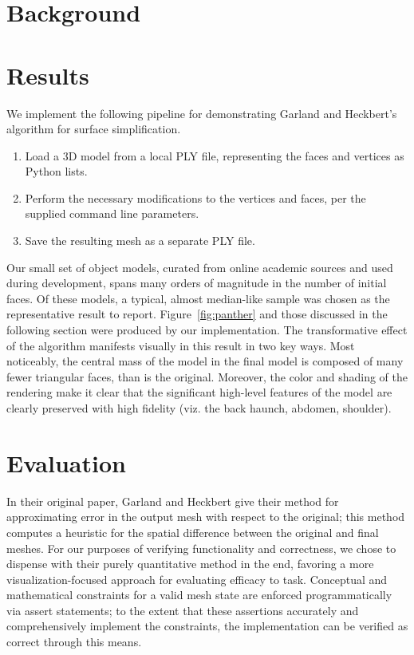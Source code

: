 \documentclass{acmsiggraph}
\begin{document}
\section{Background}

\section{Results}
We implement the following pipeline for demonstrating Garland and Heckbert's
algorithm for surface simplification. %
\begin{enumerate}
    \item Load a 3D model from a local PLY file, representing the faces and
    vertices as Python lists.
    \item Perform the necessary modifications to the vertices and faces, per
    the supplied command line parameters.
    \item Save the resulting mesh as a separate PLY file.
\end{enumerate}

Our small set of object models, curated from online academic sources and used
during development, spans many orders of magnitude in the number of initial
faces. Of these models, a typical, almost median-like sample was chosen as the
representative result to report. Figure~\ref{fig:panther} and those discussed in the %
following section were produced by our implementation. The transformative
effect of the algorithm manifests visually in this result in two key ways. Most
noticeably, the central mass of the model in the final model is composed of
many fewer triangular faces, than is the original. Moreover, the color and
shading of the rendering make it clear that the significant high-level features
of the model are clearly preserved with high fidelity (viz. the back haunch,
abdomen, shoulder).




\section{Evaluation}
In their original paper, Garland and Heckbert give their method for
approximating error in the output mesh with respect to the original; this
method computes a heuristic for the spatial difference between the original and
final meshes. For our purposes of verifying functionality and correctness, we
chose to dispense with their purely quantitative method in the end, favoring a
more visualization-focused approach for evaluating efficacy to task. Conceptual
and mathematical constraints for a valid mesh state are enforced
programmatically via assert statements; to the extent that these assertions
accurately and comprehensively implement the constraints, the implementation
can be verified as correct through this means.
\end{document}

